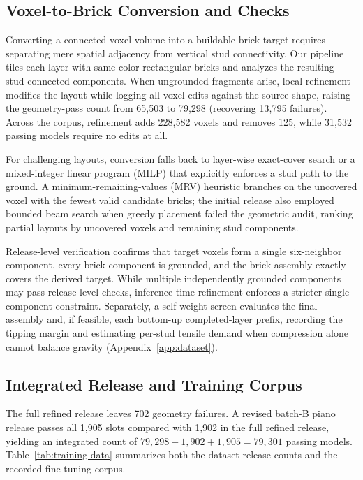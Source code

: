 \documentclass[letterpaper]{article} %
\begin{document}
\subsection{Voxel-to-Brick Conversion and Checks}
Converting a connected voxel volume into a buildable brick target requires separating mere spatial adjacency from vertical stud connectivity. Our pipeline tiles each layer with same-color rectangular bricks and analyzes the resulting stud-connected components. When ungrounded fragments arise, local refinement modifies the layout while logging all voxel edits against the source shape, raising the geometry-pass count from 65,503 to 79,298 (recovering 13,795 failures). Across the corpus, refinement adds 228,582 voxels and removes 125, while 31,532 passing models require no edits at all.

For challenging layouts, conversion falls back to layer-wise exact-cover search or a mixed-integer linear program (MILP) that explicitly enforces a stud path to the ground. A minimum-remaining-values (MRV) heuristic branches on the uncovered voxel with the fewest valid candidate bricks; the initial release also employed bounded beam search when greedy placement failed the geometric audit, ranking partial layouts by uncovered voxels and remaining stud components.

Release-level verification confirms that target voxels form a single six-neighbor component, every brick component is grounded, and the brick assembly exactly covers the derived target. While multiple independently grounded components may pass release-level checks, inference-time refinement enforces a stricter single-component constraint. Separately, a self-weight screen evaluates the final assembly and, if feasible, each bottom-up completed-layer prefix, recording the tipping margin and estimating per-stud tensile demand when compression alone cannot balance gravity (Appendix~\ref{app:dataset}).

\subsection{Integrated Release and Training Corpus}
The full refined release leaves 702 geometry failures. A revised batch-B piano release passes all 1,905 slots compared with 1,902 in the full refined release, yielding an integrated count of $79{,}298-1{,}902+1{,}905=79{,}301$ passing models. Table~\ref{tab:training-data} summarizes both the dataset release counts and the recorded fine-tuning corpus.

\end{document}

